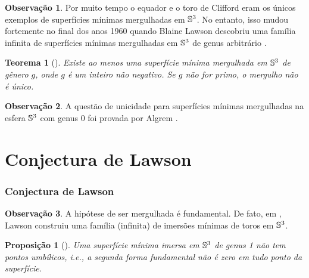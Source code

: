 \documentclass[12pt,a4paper]{beamer}
\newtheorem{teorema}{Teorema}
\newtheorem{proposicao}{Proposição}
\theoremstyle{definition}
\newtheorem{observacao}{Observação}
\begin{document}
\begin{frame}
	
	
	\begin{observacao}
		Por muito tempo o equador e o toro de Clifford eram os únicos exemplos de superfícies mínimas mergulhadas em $\mathbb{S}^3$. No entanto, isso mudou fortemente no final dos
		anos 1960 quando Blaine Lawson descobriu uma família infinita de superfícies mínimas
		mergulhadas em $\mathbb{S}^3$ de genus arbitrário \cite{Lawson1970}.
	\end{observacao}
	
	\pause
	
	\begin{teorema}[\cite{Lawson1970}]
		Existe ao menos uma superfície mínima mergulhada em $\mathbb{S}^3$	de gênero $g$, onde $g$ é um inteiro não negativo. Se $g$ não for primo, o mergulho não é único.
	\end{teorema}
	
	\pause
	
	\begin{observacao}
		A questão de unicidade para superfícies mínimas mergulhadas na esfera $\mathbb{S}^3$ com genus $0$ foi provada por Algrem \cite{Almgren1966}.
	\end{observacao}
\end{frame}


\section{Conjectura de Lawson}

\begin{frame}
	\frametitle{Conjectura de Lawson}
	

	\begin{observacao}
		A hipótese de ser mergulhada é fundamental. De fato, em \cite{Lawson1969}, Lawson construiu uma família (infinita) de imersões mínimas de toros em $\mathbb{S}^3$. 
	\end{observacao}

	\pause

	\begin{proposicao}[\cite{Brendle2013}]
		\label{sup-min-nao-tem-pontos-umbilicos}
		Uma superfície mínima imersa em $\mathbb{S}^3$ de genus 1 não tem pontos umbílicos, i.e., a segunda forma fundamental não é zero em tudo ponto da superfície.
	\end{proposicao}

\end{frame}
\end{document}
